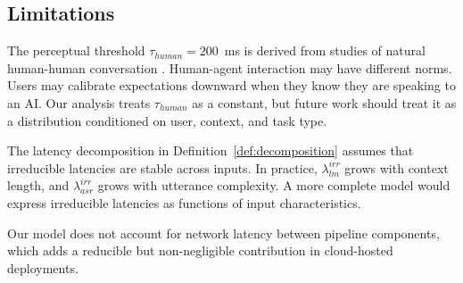 \subsection{Limitations}

The perceptual threshold $\tau_{human} = 200$~ms is derived from studies of natural human-human conversation \citep{levinson2015timing,stivers2009universals}.
Human-agent interaction may have different norms.
Users may calibrate expectations downward when they know they are speaking to an AI.
Our analysis treats $\tau_{human}$ as a constant, but future work should treat it as a distribution conditioned on user, context, and task type.

The latency decomposition in Definition~\ref{def:decomposition} assumes that irreducible latencies are stable across inputs.
In practice, $\lambda_{lm}^{irr}$ grows with context length, and $\lambda_{asr}^{irr}$ grows with utterance complexity.
A more complete model would express irreducible latencies as functions of input characteristics.

Our model does not account for network latency between pipeline components, which adds a reducible but non-negligible contribution in cloud-hosted deployments.

